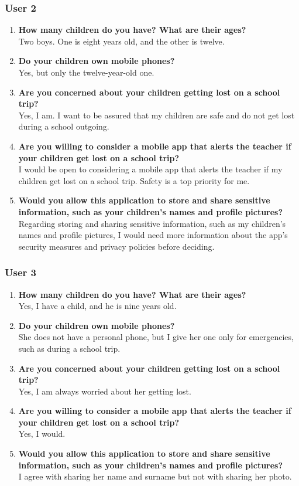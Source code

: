 \subsubsection*{User 2}
\begin{enumerate}
\item \textbf{How many children do you have? What are their ages?} \\
Two boys. One is eight years old, and the other is twelve.
\item \textbf{Do your children own mobile phones?}
\\ Yes, but only the twelve-year-old one.
\item \textbf{Are you concerned about your children getting lost on a school trip?}
\\ Yes, I am. I want to be assured that my children are safe and do not get lost during a school outgoing.
\item \textbf{Are you willing to consider a mobile app that alerts the teacher if your children get lost on a school trip?}
\\ I would be open to considering a mobile app that alerts the teacher if my children get lost on a school trip. Safety is a top priority for me.
\item \textbf{Would you allow this application to store and share sensitive information, such as your children's names and profile pictures?}
\\ Regarding storing and sharing sensitive information, such as my children's names and profile pictures, I would need more information about the app's security measures and privacy policies before deciding.
\end{enumerate}

\subsubsection*{User 3}
\begin{enumerate}
\item \textbf{How many children do you have? What are their ages?}
\\ Yes, I have a child, and he is nine years old.
\item \textbf{Do your children own mobile phones?}
\\ She does not have a personal phone, but I give her one only for emergencies, such as during a school trip.
\item \textbf{Are you concerned about your children getting lost on a school trip?}
\\ Yes, I am always worried about her getting lost.
\item \textbf{Are you willing to consider a mobile app that alerts the teacher if your children get lost on a school trip?}
\\ Yes, I would.
\item \textbf{Would you allow this application to store and share sensitive information, such as your children's names and profile pictures?}
\\ I agree with sharing her name and surname but not with sharing her photo. 
\end{enumerate}

